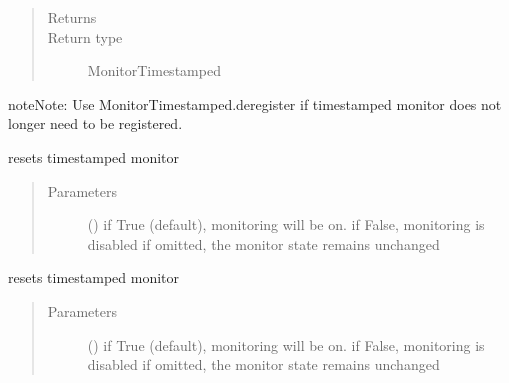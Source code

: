 \documentclass[letterpaper,10pt,english]{sphinxmanual}
\begin{document}
\begin{fulllineitems}
\begin{fulllineitems}
\begin{quote}
\begin{description}
\item[{Returns}] \leavevmode
{}

\item[{Return type}] \leavevmode
MonitorTimestamped

\end{description}\end{quote}

\begin{sphinxadmonition}{note}{Note:}
Use MonitorTimestamped.deregister if timestamped monitor does not longer need to be registered.
\end{sphinxadmonition}

\end{fulllineitems}


\begin{fulllineitems}
\label{\detokenize{Reference:salabim.MonitorTimestamp.reset}}
resets timestamped monitor
\begin{quote}\begin{description}
\item[{Parameters}] \leavevmode
{} () \textendash{} if True (default), monitoring will be on. 
if False, monitoring is disabled 
if omitted, the monitor state remains unchanged

\end{description}\end{quote}

\end{fulllineitems}


\begin{fulllineitems}
\label{\detokenize{Reference:salabim.MonitorTimestamp.reset_monitors}}
resets timestamped monitor
\begin{quote}\begin{description}
\item[{Parameters}] \leavevmode
{} () \textendash{} if True (default), monitoring will be on. 
if False, monitoring is disabled 
if omitted, the monitor state remains unchanged


\end{description}
\end{quote}
\end{fulllineitems}
\end{fulllineitems}
\end{document}
